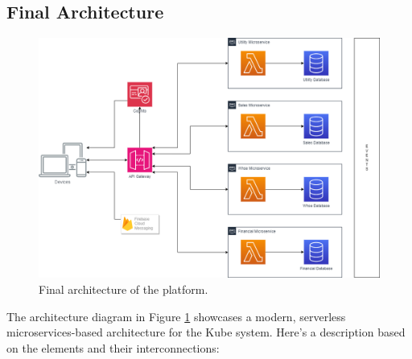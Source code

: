 \subsection{Final Architecture}
\begin{figure}
    \centering
    \includegraphics[scale=0.35]{Pictures/5_architecture.png}
    \caption{Final architecture of the platform.}
    \label{fig:5_architecture}
\end{figure}
The architecture diagram in Figure \ref{fig:5_architecture} showcases a modern, serverless
microservices-based architecture for the Kube system. Here's a description based on the elements and
their interconnections:

